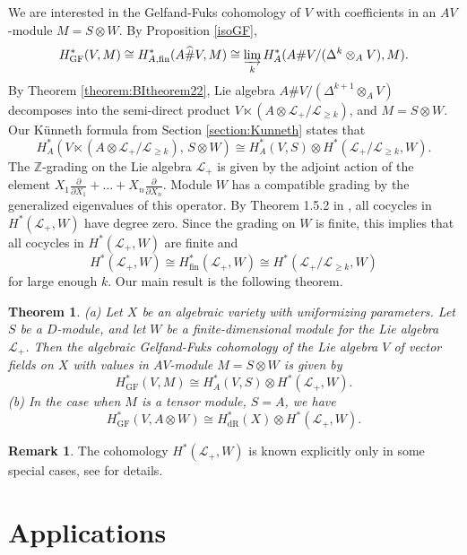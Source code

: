 \documentclass[12pt]{amsart}
\renewcommand{\L}{{\mathcal{L}}}
\newcommand{\Z}{{\mathbb{Z}}}
\renewcommand{\sp}{{\#}}
\newtheorem{theorem}{Theorem}[section]
\theoremstyle{definition}
\newtheorem{remark}[definition]{Remark}
\begin{document}
We are interested in the Gelfand-Fuks cohomology of $V$ with coefficients in an $AV$-module $M = S \otimes W$. By Proposition \ref{isoGF},
\[
H^*_\text{GF} (V, M) \cong H^*_{A, \text{fin}} (A \widehat{\sp} V, M)
\cong \varinjlim\limits_{k} H_{A}^* (A \sp V / (\Delta^k \otimes_A V), M).
\]
By Theorem \ref{theorem:BItheorem22}, Lie algebra $A \sp V / (\Delta^{k+1} \otimes_A V)$ decomposes into the semi-direct product $V \ltimes (A \otimes \L_+/\L_{\geq k})$, and $M = S \otimes W$. 
Our K\"unneth formula from Section \ref{section:Kunneth} states that 
\[
H^*_A (V \ltimes (A \otimes \L_+/\L_{\geq k}),\, S \otimes W) \cong H^*_A (V, S) \otimes H^*(\L_+/\L_{\geq k}, W).
\]
The $\Z$-grading on the Lie algebra $\L_+$ is given by the adjoint action of the element $X_1 \frac{\partial}{\partial X_1} + \ldots + X_n \frac{\partial}{\partial X_n}$. Module $W$ has a compatible grading by the generalized eigenvalues of this operator. By Theorem 1.5.2 in \cite{Fuks1986}, all cocycles in $H^*(\L_+, W)$ have degree zero. Since the grading on $W$ is finite, this implies that all cocycles in $H^*(\L_+, W)$ are finite and 
\[
H^*(\L_+, W) \cong H^*_\text{fin}(\L_+, W) \cong H^*(\L_+/\L_{\geq k}, W)
\]
for large enough $k$.
Our main result is the following theorem.
\begin{theorem}
\label{theorem:main}
(a) Let $X$ be an algebraic variety with uniformizing parameters. Let $S$ be a $D$-module, and let $W$ be a finite-dimensional module for the Lie algebra $\L_+$. Then the algebraic Gelfand-Fuks cohomology of the Lie algebra $V$ of vector fields on $X$ with values in $AV$-module $M = S \otimes W$ is given by
\[
H^*_\text{GF} (V, M) \cong H^*_A (V, S) \otimes H^*(\L_+, W).
\]
(b) In the case when $M$ is a tensor module, $S = A$, we have
\[
H^*_\text{GF} (V, A \otimes W) \cong H^*_\text{dR}(X) \otimes H^*(\L_+, W).
\]
\end{theorem}

\begin{remark}
The cohomology $H^*(\L_+, W)$ is known explicitly only in some special cases, see \cite{Fuks1986} for details.    
\end{remark}

\section{Applications}
\end{document}
